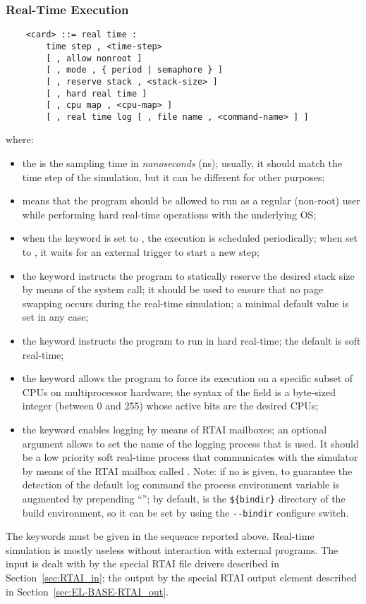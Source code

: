 \subsubsection{Real-Time Execution}\label{sec:REAL-TIME}
\begin{verbatim}
    <card> ::= real time :
        time step , <time-step> 
        [ , allow nonroot ]
        [ , mode , { period | semaphore } ]
        [ , reserve stack , <stack-size> ]
        [ , hard real time ]
        [ , cpu map , <cpu-map> ]
        [ , real time log [ , file name , <command-name> ] ]
\end{verbatim}
where:
\begin{itemize}
\item the  is the sampling time in \emph{nanoseconds} (ns); 
usually, it should match the time step 
of the simulation, but it can be different for other purposes;
\item {} means that the program should be allowed to run
as a regular (non-root) user while performing hard real-time operations
with the underlying OS;
\item when the keyword  is set to , the execution
is scheduled periodically; when set to , it waits 
for an external trigger to start a new step;
\item the keyword  instructs the program 
to statically reserve the desired stack size by means 
of the  system call; it should be used to ensure 
that no page swapping occurs during the real-time simulation;
a minimal default value is set in any case;
\item the keyword  instructs the program to run
in hard real-time; the default is soft real-time;
\item the keyword  allows the program to force its
execution on a specific subset of CPUs on multiprocessor hardware;
the syntax of the  field is a byte-sized integer 
(between 0 and 255) whose active bits are the desired CPUs;
\item the keyword  enables logging by means 
of RTAI mailboxes; an optional  argument allows 
to set the name of the logging process that is used.
It should be a low priority soft real-time process that communicates
with the simulator by means of the RTAI mailbox called .
Note: if no  is given, to guarantee the detection 
of the default log command the process  environment variable 
is augmented by prepending ``''; by default,
 is the \verb;${bindir}; directory of the build environment,
so it can be set by using the \verb;--bindir; configure switch.
\end{itemize}
The keywords must be given in the sequence reported above.
Real-time simulation is mostly useless without interaction 
with external programs.
The input is dealt with by the special RTAI file drivers described
in Section~\ref{sec:RTAI_in}; the output by the special RTAI output
element described in Section~\ref{sec:EL-BASE-RTAI_out}.



